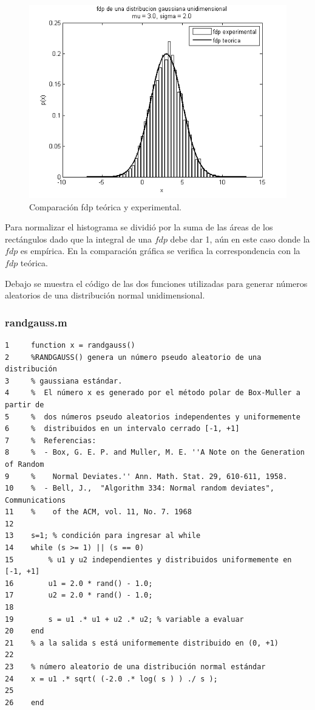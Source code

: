 \documentclass[11pt,a4paper,final]{article}
\begin{document}
\begin{figure}
	\centering
	\includegraphics[width=\textwidth]{Ejercicio1_01.png}
	\caption{Comparación fdp teórica y experimental.}
	\label{ejercicio11}
\end{figure}

Para normalizar el histograma se dividió por la suma de las áreas de los rectángulos dado que la integral de una $fdp$ debe dar 1, aún en este caso donde la $fdp$ es empírica. En la comparación gráfica se verifica la correspondencia con la $fdp$ teórica.


Debajo se muestra el código de las dos funciones utilizadas para generar números aleatorios de una distribución normal unidimensional.



\subsubsection*{randgauss.m}

\begin{verbatim}
1     function x = randgauss()
2     %RANDGAUSS() genera un número pseudo aleatorio de una distribución 
3     % gaussiana estándar. 
4     %  El número x es generado por el método polar de Box-Muller a partir de 
5     %  dos números pseudo aleatorios independentes y uniformemente 
6     %  distribuidos en un intervalo cerrado [-1, +1]
7     %  Referencias: 
8     %  - Box, G. E. P. and Muller, M. E. ''A Note on the Generation of Random 
9     %    Normal Deviates.'' Ann. Math. Stat. 29, 610-611, 1958.
10    %  - Bell, J.,  "Algorithm 334: Normal random deviates", Communications 
11    %    of the ACM, vol. 11, No. 7. 1968
12    
13    s=1; % condición para ingresar al while
14    while (s >= 1) || (s == 0)
15        % u1 y u2 independientes y distribuidos uniformemente en [-1, +1]
16        u1 = 2.0 * rand() - 1.0;
17        u2 = 2.0 * rand() - 1.0;
18    	
19        s = u1 .* u1 + u2 .* u2; % variable a evaluar
20    end
21    % a la salida s está uniformemente distribuido en (0, +1)
22    
23    % número aleatorio de una distribución normal estándar
24    x = u1 .* sqrt( (-2.0 .* log( s ) ) ./ s ); 
25    
26    end
\end{verbatim}
    
\end{document}
